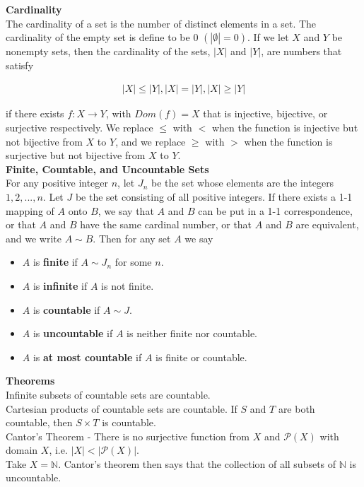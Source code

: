 \documentclass{article}
\numberwithin{theorem}{subsection}
\numberwithin{theorem}{subsubsection}
\numberwithin{lemma}{subsection}
\numberwithin{lemma}{subsubsection}
\theoremstyle{definition}
\numberwithin{definition}{subsection}
\numberwithin{definition}{subsubsection}
\begin{document}
\noindent \textbf{Cardinality} \\
\indent The cardinality of a set is the number of distinct elements in a set. The cardinality of the empty set is define to be 0 $(|\emptyset| = 0)$. If we let $X$ and $Y$ be nonempty sets, then the cardinality of the sets, $|X|$ and $|Y|$, are numbers that satisfy

\begin{gather*}
    |X| \leq |Y|, |X| = |Y|, |X| \geq |Y|
\end{gather*}

\noindent if there exists $f: X \rightarrow Y$, with $Dom(f) = X$ that is injective, bijective, or surjective respectively. We replace $\leq$ with $<$ when the function is injective but not bijective from $X$ to $Y$, and we replace $\geq$ with $>$ when the function is surjective but not bijective from $X$ to $Y$. \\

\noindent \textbf{Finite, Countable, and Uncountable Sets} \\
\indent For any positive integer $n$, let $J_{n}$ be the set whose elements are the integers $1,2,...,n$. Let $J$ be the set consisting of all positive integers. If there exists a 1-1 mapping of $A$ onto $B$, we say that $A$ and $B$ can be put in a 1-1 correspondence, or that $A$ and $B$ have the same cardinal number, or that $A$ and $B$ are equivalent, and we write $A \sim B$. Then for any set $A$ we say
\begin{itemize}
    \item $A$ is \textbf{finite} if $A \sim J_{n}$ for some $n$.
    \item $A$ is \textbf{infinite} if $A$ is not finite.
    \item $A$ is \textbf{countable} if $A \sim J$.
    \item $A$ is \textbf{uncountable} if $A$ is neither finite nor countable.
    \item $A$ is \textbf{at most countable} if $A$ is finite or countable.
\end{itemize}


\noindent \textbf{Theorems} \\
\indent Infinite subsets of countable sets are countable. \\
\indent Cartesian products of countable sets are countable. If $S$ and $T$ are both countable, then $S \times T$ is countable.\\
\indent Cantor's Theorem - There is no surjective function from $X$ and $\mathcal{P}(X)$ with domain $X$, i.e. $|X| < |\mathcal{P}(X)|$.  \\
\indent Take $X = \mathbb{N}$. Cantor's theorem then says that the collection of all subsets of $\mathbb{N}$ is uncountable. 
\end{document}
